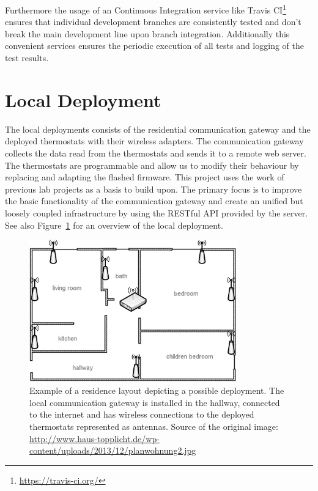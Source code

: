 Furthermore the usage of an Continuous Integration service like Travis CI\footnote{\url{https://travis-ci.org/}} ensures that individual development branches are consistently tested and don't break the main development line upon branch integration.
Additionally this convenient services ensures the periodic execution of all tests and logging of the test results.




\section{Local Deployment}
\label{sec:local_infrastructure}

The local deployments consists of the residential communication gateway and the deployed thermostats with their wireless adapters. The communication gateway collects the data read from the thermostats and sends it to a remote web server. The thermostats are programmable and allow us to modify their behaviour by replacing and adapting the flashed firmware. This project uses the work of previous lab projects as a basis to build upon. The primary focus is to improve the basic functionality of the communication gateway and create an unified but loosely coupled infrastructure by using the RESTful API provided by the server.
See also Figure~\ref{fig:residence_layout} for an overview of the local deployment.

\begin{figure}[h]
\begin{center}
\includegraphics[width=0.8\textwidth]{images/residence_layout_schema.png}
\end{center}
\caption{Example of a residence layout depicting a possible deployment. The local communication gateway is installed in the hallway, connected to the internet and has wireless connections to the deployed thermostats represented as antennas. Source of the original image: \url{http://www.haus-topplicht.de/wp-content/uploads/2013/12/planwohnung2.jpg}}
\label{fig:residence_layout}
\end{figure}


